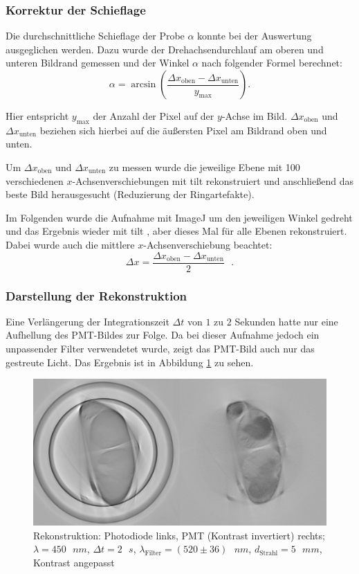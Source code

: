\subsubsection{Korrektur der Schieflage}
Die durchschnittliche Schieflage der Probe $\alpha$ konnte bei der Auswertung ausgeglichen werden.
Dazu wurde der Drehachsendurchlauf am oberen und unteren Bildrand gemessen und der Winkel $\alpha$ nach folgender Formel berechnet:
$$\alpha = \arcsin \left( \frac{\Delta{x_{\text{oben}}} - \Delta{x_{\text{unten}}}}{y_{\text{max}}} \right) .$$

Hier entspricht $y_\text{max}$ der Anzahl der Pixel auf der $y$-Achse im Bild.
$\Delta{x_\text{oben}}$ und $\Delta{x_\text{unten}}$ beziehen sich hierbei auf die äußersten Pixel am Bildrand oben und unten.

Um $\Delta{x_{\text{oben}}}$ und $\Delta{x_{\text{unten}}}$ zu messen wurde die jeweilige Ebene mit 100 verschiedenen $x$-Achsenverschiebungen mit  \glqq tilt\grqq{} rekonstruiert und anschließend das beste Bild herausgesucht (Reduzierung der Ringartefakte).

Im Folgenden wurde die Aufnahme mit \glqq ImageJ\grqq{} um den jeweiligen Winkel gedreht und das Ergebnis wieder mit  \glqq tilt\grqq{} , aber dieses Mal für alle Ebenen rekonstruiert.
Dabei wurde auch die mittlere $x$-Achsenverschiebung beachtet:
$$\Delta{x} = \frac{\Delta{x_{\text{oben}}} - \Delta{x_{\text{unten}}}}{2}\text{ }.$$

\subsubsection{Darstellung der Rekonstruktion}
Eine Verlängerung der Integrationszeit $\Delta{t}$ von $1$ zu $2$ Sekunden hatte nur eine Aufhellung des PMT-Bildes zur Folge.
Da bei dieser Aufnahme jedoch ein unpassender Filter verwendetet wurde, zeigt das PMT-Bild auch nur das gestreute Licht. Das Ergebnis ist in Abbildung \ref{fig:lang-int} zu sehen.

\begin{figure}[ht]
\centering
\includegraphics[width=\linewidth]{IMAGE/both-2-450-5-1-c.png}
\caption{Rekonstruktion: Photodiode links, PMT (Kontrast invertiert) rechts; $\lambda = 450 \text{ } \si{nm}$, $\Delta{t} = 2 \text{ } \si{s}$, $\lambda_\text{Filter} = (520 \pm 36) \text{ } \si{nm}$, $d_\text{Strahl} = 5 \text{ } \si{mm}$, Kontrast angepasst}
	\label{fig:lang-int}
\end{figure}


